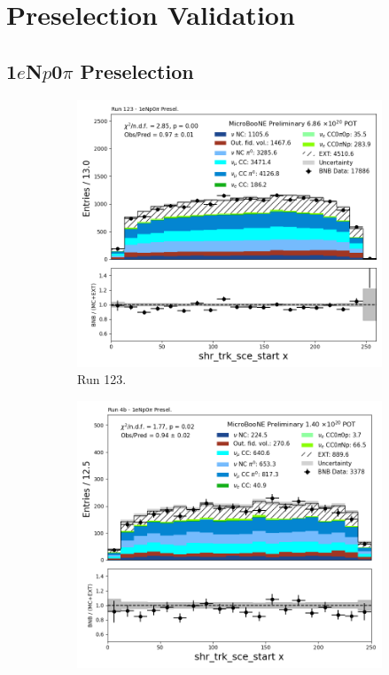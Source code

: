 \section{Preselection Validation}

\subsection{1$e$N$p$0$\pi$ Preselection}
\label{appendix:Np0pi_preselection}

\begin{figure}[H]
    \centering
    \begin{subfigure}[t]{0.32\linewidth}
        \includegraphics[width=\linewidth]{technote/Appendix_Preselection/Figures/1eNp0pi/Run123/shr_trk_sce_start_x_Run123_1eNp0pi_Presel.png}
        \caption{Run 123.}
    \end{subfigure}%
    \hspace{0.2cm}%
    \begin{subfigure}[t]{0.32\linewidth}
        \includegraphics[width=\linewidth]{technote/Appendix_Preselection/Figures/1eNp0pi/Run4b/shr_trk_sce_start_x_Run4b_1eNp0pi_Presel.png}

\end{subfigure}
\end{figure}
